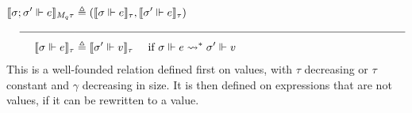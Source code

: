 \begin{definition}
\begin{equation}
\begin{aligned}[c]
  \llbracket \sigma; \sigma' \Vdash e \rrbracket_{M_q \tau} &\triangleq
    (\llbracket \sigma \Vdash e \rrbracket_{\tau}, \llbracket \sigma' \Vdash e
    \rrbracket_{\tau}) \\
  \rule{5em}{0.4pt}&\rule{30em}{0.4pt}\\
  \llbracket \sigma \Vdash e \rrbracket_{\tau} &\triangleq \llbracket \sigma'
    \Vdash v\rrbracket_{\tau} \quad{\text{ if } \sigma \Vdash e
    \rightsquigarrow^* \sigma' \Vdash v}
  \end{aligned}
  \end{equation}
  This is a well-founded relation defined first on values, with $\tau$
  decreasing or $\tau$ constant and $\gamma$ decreasing in size. It is then
  defined on expressions that are not values, if it can be rewritten to a value.
\end{definition}

